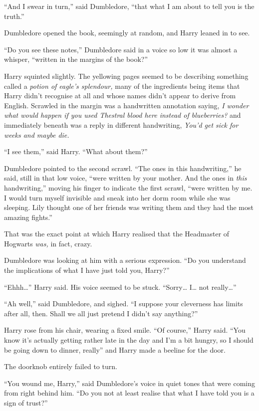 ``And I swear in turn,'' said Dumbledore, ``that what I am about to tell
you is the truth.''

Dumbledore opened the book, seemingly at random, and Harry leaned in to
see.

``Do you see these notes,'' Dumbledore said in a voice so low it was
almost a whisper, ``written in the margins of the book?''

Harry squinted slightly. The yellowing pages seemed to be describing
something called a \emph{potion of eagle's splendour,} many of the
ingredients being items that Harry didn't recognise at all and whose
names didn't appear to derive from English. Scrawled in the margin was a
handwritten annotation saying, \emph{I wonder what would happen if you
used Thestral blood here instead of blueberries?} and immediately
beneath was a reply in different handwriting, \emph{You'd get sick for
weeks and maybe die.}

``I see them,'' said Harry. ``What about them?''

Dumbledore pointed to the second scrawl. ``The ones in this
handwriting,'' he said, still in that low voice, ``were written by your
mother. And the ones in \emph{this} handwriting,'' moving his finger to
indicate the first scrawl, ``were written by me. I would turn myself
invisible and sneak into her dorm room while she was sleeping. Lily
thought one of her friends was writing them and they had the most
amazing fights.''

That was the exact point at which Harry realised that the Headmaster of
Hogwarts \emph{was,} in fact, crazy.

Dumbledore was looking at him with a serious expression. ``Do you
understand the implications of what I have just told you, Harry?''

``Ehhh\ldots{}'' Harry said. His voice seemed to be stuck.
``Sorry\ldots{} I\ldots{} not really\ldots{}''

``Ah well,'' said Dumbledore, and sighed. ``I suppose your cleverness
has limits after all, then. Shall we all just pretend I didn't say
anything?''

Harry rose from his chair, wearing a fixed smile. ``Of course,'' Harry
said. ``You know it's actually getting rather late in the day and I'm a
bit hungry, so I should be going down to dinner, really'' and Harry made
a beeline for the door.

The doorknob entirely failed to turn.

``You wound me, Harry,'' said Dumbledore's voice in quiet tones that
were coming from right behind him. ``Do you not at least realise that
what I have told you is a sign of trust?''

